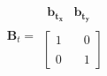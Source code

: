 \documentclass[preview]{standalone}
\begin{document}
\begin{align*}
\mathbf{B}_t = \begin{array}{c}\begin{matrix}\mathbf{b_{t_x}} &\mathbf{b_{t_y}} \end{matrix} \\\begin{bmatrix} 1 & \quad 0 \\ \\0 & \quad 1 \end{bmatrix} \end{array}
\end{align*}
\end{document}
